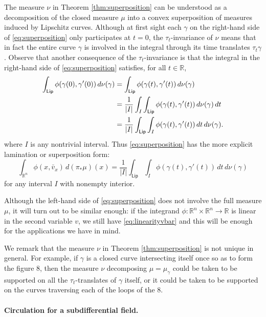 \documentclass[11pt]{article}
\theoremstyle{definition}
\theoremstyle{remark}
\newcommand{\R}{\mathbb{R}}
\newcommand{\lipschitz}{\mathsf{Lip}}
\begin{document}
The measure $\nu$ in Theorem \ref{thm:superposition} can be understood as a decomposition of the closed measure $\mu$ into a convex superposition of measures induced by Lipschitz curves. Although at first sight each $\gamma$ on the right-hand side of \eqref{eq:superposition} only participates at $t=0$, the $\tau_t$-invariance of $\nu$ means that in fact the entire curve $\gamma$ is involved in the integral through its time translates $\tau_t\gamma$. 
Observe that another consequence of the $\tau_t$-invariance is that the integral in the right-hand side of \eqref{eq:superposition} satisfies, for all $t\in\R$,
\begin{align}
 \notag\int_{\lipschitz}\phi(\gamma(0),\gamma'(0))\,d\nu(\gamma)& = \int_{\lipschitz}\phi(\gamma(t),\gamma'(t))\,d\nu(\gamma)\\
 \label{eq:timetranslationinv}& =  \frac{1}{|I|}\int_I\int_{\lipschitz}\phi(\gamma(t),\gamma'(t))\,d\nu(\gamma)\, dt\\ \notag
 & = \frac{1}{|I|}\int_{\lipschitz}\int_I\phi(\gamma(t),\gamma'(t))\,dt\,d\nu(\gamma). \notag
\end{align}
where $I$ is any nontrivial interval. Thus  \eqref{eq:superposition} has the more explicit lamination or superposition form:
\begin{equation}\label{eq:superposition2}
  \int_{\R^n} \phi(x,\bar v_x)\,d(\pi_*\mu)(x)=\frac{1}{|I|}\int_{\lipschitz}\int_I\phi(\gamma(t),\gamma'(t))\,dt\,d\nu(\gamma) 
 \end{equation}
 for any interval $I$ with nonempty interior.
 \smallskip
 
 
Although the left-hand side of \eqref{eq:superposition} does not involve the full measure $\mu$, it will turn out to be similar enough: if the integrand $\phi\colon\R^n\times\R^n\to\R$ is linear in the second variable $v$, we still have \eqref{eq:linearityvbar} %
%
and this will be enough for the applications we have in mind.

We remark that the measure $\nu$ in Theorem \ref{thm:superposition} is not unique in general. For example, if $\gamma$ is a closed curve intersecting itself once so as to form the figure 8, then the measure $\nu$ decomposing $\mu=\mu_\gamma$ could be taken to be supported on all the $\tau_t$-translates of $\gamma$ itself, or it could be taken to be supported on the curves traversing each of the loops of the 8. 



\paragraph{Circulation for a subdifferential field.}
%
\end{document}

